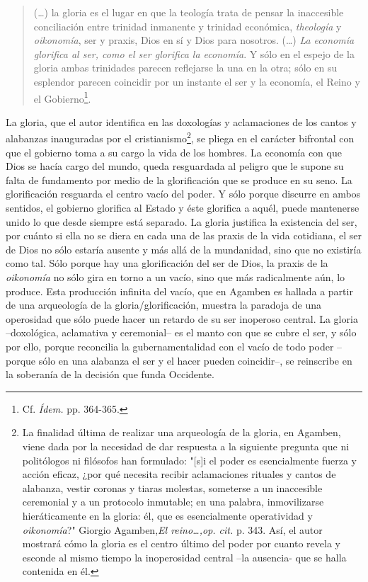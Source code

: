 \documentclass{book}
\begin{document}
\begin{quote}
(\dots) la gloria es el lugar en que la teología trata de pensar la
inaccesible conciliación entre trinidad inmanente y trinidad económica,
\emph{theología} y \emph{oikonomía}, ser y praxis, Dios en sí y Dios
para nosotros. (\dots) \emph{La economía glorifica al ser, como el
ser glorifica la economía}. Y sólo en el espejo de la gloria ambas
trinidades parecen reflejarse la una en la otra; sólo en su esplendor
parecen coincidir por un instante el ser y la economía, el Reino y el
Gobierno\footnote{Cf. \emph{Ídem.} pp. 364-365.}.
\end{quote}

La gloria, que el autor identifica en las doxologías y aclamaciones de
los cantos y alabanzas inauguradas por el cristianismo\footnote{La
  finalidad última de realizar una arqueología de la gloria, en Agamben,
  viene dada por la necesidad de dar respuesta a la siguiente pregunta
  que ni politólogos ni filósofos han formulado: "{[}s{]}i el poder es
  esencialmente fuerza y acción eficaz, ¿por qué necesita recibir
  aclamaciones rituales y cantos de alabanza, vestir coronas y tiaras
  molestas, someterse a un inaccesible ceremonial y a un protocolo
  inmutable; en una palabra, inmovilizarse hieráticamente en la gloria:
  él, que es esencialmente operatividad y \emph{oikonomía}?" Giorgio
  Agamben,\emph{El reino\ldots,op. cit.} p. 343. Así, el autor mostrará
  cómo la gloria es el centro último del poder por cuanto revela y
  esconde al mismo tiempo la inoperosidad central --la ausencia- que se
  halla contenida en él.}, se pliega en el carácter bifrontal con que el
gobierno toma a su cargo la vida de los hombres. La economía con que
Dios se hacía cargo del mundo, queda resguardada al peligro que le
supone su falta de fundamento por medio de la glorificación que se
produce en su seno. La glorificación resguarda el centro vacío del
poder. Y sólo porque discurre en ambos sentidos, el gobierno glorifica
al Estado y éste glorifica a aquél, puede mantenerse unido lo que desde
siempre está separado. La gloria justifica la existencia del ser, por
cuánto si ella no se diera en cada una de las praxis de la vida
cotidiana, el ser de Dios no sólo estaría ausente y más allá de la
mundanidad, sino que no existiría como tal. Sólo porque hay una
glorificación del ser de Dios, la praxis de la \emph{oikonomía} no sólo
gira en torno a un vacío, sino que más radicalmente aún, lo produce.
Esta producción infinita del vacío, que en Agamben es hallada a partir
de una arqueología de la gloria/glorificación, muestra la paradoja de
una operosidad que sólo puede hacer un retardo de su ser inoperoso
central. La gloria --doxológica, aclamativa y ceremonial-- es el manto
con que se cubre el ser, y sólo por ello, porque reconcilia la
gubernamentalidad con el vacío de todo poder --porque sólo en una
alabanza el ser y el hacer pueden coincidir--, se reinscribe en la
soberanía de la decisión que funda Occidente.
\end{document}
